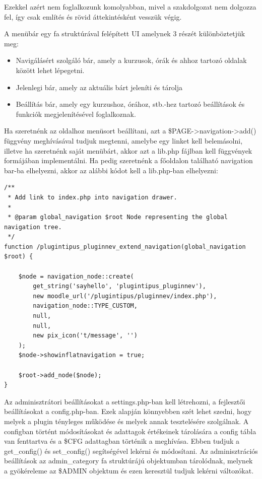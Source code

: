 Ezekkel azért nem foglalkozunk komolyabban, mivel a szakdolgozat nem dolgozza fel, így csak említés és rövid áttekintésként vesszük végig. \par

A menübár egy fa struktúrával felépített UI amelynek 3 részét különböztetjük meg:
\begin{itemize}
    \item Navigálásért szolgáló bár, amely a kurzusok, órák és ahhoz tartozó oldalak között lehet lépegetni.
    \item Jelenlegi bár, amely az aktuális bárt jeleníti és tárolja
    \item Beállítás bár, amely egy kurzushoz, órához, stb.-hez tartozó beállítások és funkciók megjelenítésével foglalkoznak.
\end{itemize}

Ha szeretnénk az oldalhoz menüsort beállítani, azt a \$PAGE->navigation->add() függvény meghívásával tudjuk megtenni, amelybe egy linket kell belemásolni, illetve ha szeretnénk saját menübárt, akkor azt a lib.php fájlban kell függvények formájában implementálni. Ha pedig szeretnénk a főoldalon található navigation bar-ba elhelyezni, akkor az alábbi kódot kell a lib.php-ban elhelyezni: 

\begin{lstlisting}
/**
 * Add link to index.php into navigation drawer.
 *      
 * @param global_navigation $root Node representing the global navigation tree.
 */
function /plugintipus_pluginnev_extend_navigation(global_navigation $root) {

    $node = navigation_node::create(
        get_string('sayhello', 'plugintipus_pluginnev'), 
        new moodle_url('/plugintipus/pluginnev/index.php'),
        navigation_node::TYPE_CUSTOM,
        null,
        null,
        new pix_icon('t/message', '')
    );
    $node->showinflatnavigation = true;

    $root->add_node($node);
}
\end{lstlisting}

Az adminisztrátori beállításokat a settings.php-ban kell létrehozni, a fejlesztői beállításokat a config.php-ban. Ezek alapján könnyebben szét lehet szedni, hogy melyek a plugin tényleges működése és melyek annak tesztelésére szolgálnak. A configban történt módosításokat és adattagok értékeinek tárolására a config tábla van fenttartva és a \$CFG adattagban történik a meghívása. Ebben tudjuk a get\_config() és set\_config() segítségével lekérni és módosítani. Az adminisztrációs beállítások az admin\_category fa struktúrájú objektumban tárolódnak, melynek a gyökéreleme az \$ADMIN objektum és ezen keresztül tudjuk lekérni változókat. \par

